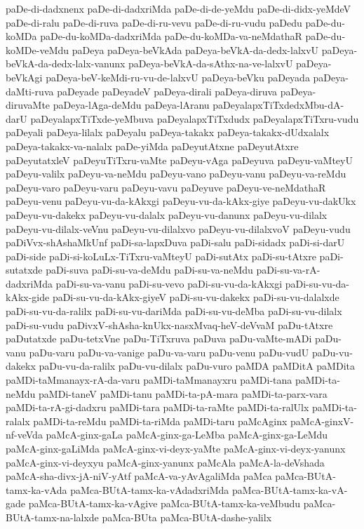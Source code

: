 {paDe-di-dadxnenx
paDe-di-dadxriMda
paDe-di-de-yeMdu
paDe-di-didx-yeMdeV
paDe-di-ralu
paDe-di-ruva
paDe-di-ru-vevu
paDe-di-ru-vudu
paDedu
paDe-du-koMDa
paDe-du-koMDa-dadxriMda
paDe-du-koMDa-va-neMdathaR
paDe-du-koMDe-veMdu
paDeya
paDeya-beVkAda
paDeya-beVkA-da-dedx-lalxvU
paDeya-beVkA-da-dedx-lalx-vanunx
paDeya-beVkA-da-sAthx-na-ve-lalxvU
paDeya-beVkAgi
paDeya-beV-keMdi-ru-vu-de-lalxvU
paDeya-beVku
paDeyada
paDeya-daMti-ruva
paDeyade
paDeyadeV
paDeya-dirali
paDeya-diruva
paDeya-diruvaMte
paDeya-lAga-deMdu
paDeya-lAranu
paDeyalapxTiTxdedxMbu-dA-darU
paDeyalapxTiTxde-yeMbuva
paDeyalapxTiTxdudx
paDeyalapxTiTxru-vudu
paDeyali
paDeya-lilalx
paDeyalu
paDeya-takakx
paDeya-takakx-dUdxalalx
paDeya-takakx-va-nalalx
paDe-yiMda
paDeyutAtxne
paDeyutAtxre
paDeyutatxleV
paDeyuTiTxru-vaMte
paDeyu-vAga
paDeyuva
paDeyu-vaMteyU
paDeyu-valilx
paDeyu-va-neMdu
paDeyu-vano
paDeyu-vanu
paDeyu-va-reMdu
paDeyu-varo
paDeyu-varu
paDeyu-vavu
paDeyuve
paDeyu-ve-neMdathaR
paDeyu-venu
paDeyu-vu-da-kAkxgi
paDeyu-vu-da-kAkx-giye
paDeyu-vu-dakUkx
paDeyu-vu-dakekx
paDeyu-vu-dalalx
paDeyu-vu-danunx
paDeyu-vu-dilalx
paDeyu-vu-dilalx-veVnu
paDeyu-vu-dilalxvo
paDeyu-vu-dilalxvoV
paDeyu-vudu
paDiVvx-shAshaMkUnf
paDi-sa-lapxDuva
paDi-salu
paDi-sidadx
paDi-si-darU
paDi-side
paDi-si-koLuLx-TiTxru-vaMteyU
paDi-sutAtx
paDi-su-tAtxre
paDi-sutatxde
paDi-suva
paDi-su-va-deMdu
paDi-su-va-neMdu
paDi-su-va-rA-dadxriMda
paDi-su-va-vanu
paDi-su-vevo
paDi-su-vu-da-kAkxgi
paDi-su-vu-da-kAkx-gide
paDi-su-vu-da-kAkx-giyeV
paDi-su-vu-dakekx
paDi-su-vu-dalalxde
paDi-su-vu-da-ralilx
paDi-su-vu-dariMda
paDi-su-vu-deMba
paDi-su-vu-dilalx
paDi-su-vudu
paDivxV-shAsha-knUkx-nasxMvaq-heV-deVvaM
paDu-tAtxre
paDutatxde
paDu-tetxVne
paDu-TiTxruva
paDuva
paDu-vaMte-mADi
paDu-vanu
paDu-varu
paDu-va-vanige
paDu-va-varu
paDu-venu
paDu-vudU
paDu-vu-dakekx
paDu-vu-da-ralilx
paDu-vu-dilalx
paDu-vuro
paMDA
paMDitA
paMDita
paMDi-taMmanayx-rA-da-varu
paMDi-taMmanayxru
paMDi-tana
paMDi-ta-neMdu
paMDi-taneV
paMDi-tanu
paMDi-ta-pA-mara
paMDi-ta-parx-vara
paMDi-ta-rA-gi-dadxru
paMDi-tara
paMDi-ta-raMte
paMDi-ta-ralUlx
paMDi-ta-ralalx
paMDi-ta-reMdu
paMDi-ta-riMda
paMDi-taru
paMcAginx
paMcA-ginxV-nf-veVda
paMcA-ginx-gaLa
paMcA-ginx-ga-LeMba
paMcA-ginx-ga-LeMdu
paMcA-ginx-gaLiMda
paMcA-ginx-vi-deyx-yaMte
paMcA-ginx-vi-deyx-yanunx
paMcA-ginx-vi-deyxyu
paMcA-ginx-yanunx
paMcAla
paMcA-la-deVshada
paMcA-sha-divx-jA-niV-yAtf
paMcA-va-yAvAgaliMda
paMca
paMca-BUtA-tamx-ka-vAda
paMca-BUtA-tamx-ka-vAdadxriMda
paMca-BUtA-tamx-ka-vA-gade
paMca-BUtA-tamx-ka-vAgive
paMca-BUtA-tamx-ka-veMbudu
paMca-BUtA-tamx-na-lalxde
paMca-BUta
paMca-BUtA-dashe-yalilx
}
